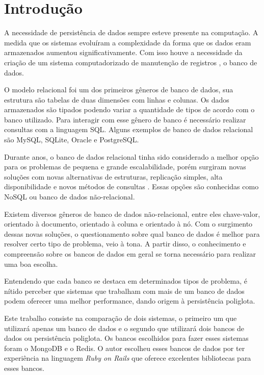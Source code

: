 \chapter{Introdução}\label{chap:introducao}
A necessidade de persistência de dados sempre esteve presente na computação. A medida que os sistemas evoluíram a complexidade da forma que os dados eram armazenados aumentou significativamente. Com isso houve a necessidade da criação de um sistema computadorizado de manutenção de registros \cite{CJDate}, o banco de dados.

O modelo relacional foi um dos primeiros gêneros de banco de dados, sua estrutura são tabelas de duas dimensões com linhas e colunas. Os dados armazenados são tipados podendo variar a quantidade de tipos de acordo com o banco utilizado. Para interagir com esse gênero de banco é necessário realizar consultas com a linguagem SQL. Alguns exemplos de banco de dados relacional são MySQL, SQLite, Oracle e PostgreSQL.

Durante anos, o banco de dados relacional tinha sido considerado a melhor opção para os problemas de pequena e grande escalabilidade, porém surgiram novas soluções com novas alternativas de estruturas, replicação simples, alta disponibilidade e novos métodos de consultas \cite{SDSW}. Essas opções são conhecidas como NoSQL ou banco de dados não-relacional.

Existem diversos gêneros de banco de dados não-relacional, entre eles chave-valor, orientado à documento, orientado à coluna e orientado à nó. Com o surgimento dessas novas soluções, o questionamento sobre qual banco de dados é melhor para resolver certo tipo de problema, veio à tona. A partir disso, o conhecimento e compreensão sobre os bancos de dados em geral se torna necessário para realizar uma boa escolha.

Entendendo que cada banco se destaca em determinados tipos de problema, é nítido perceber que sistemas que trabalham com mais de um banco de dados podem oferecer uma melhor performance, dando origem à persistência poliglota.

Este trabalho consiste na comparação de dois sistemas, o primeiro um que utilizará apenas um banco de dados e o segundo que utilizará dois bancos de dados ou persistência poliglota. Os bancos escolhidos para fazer esses sistemas foram o MongoDB e o Redis. O autor escolheu esses bancos de dados por ter experiência na linguagem \textit{Ruby on Rails} que oferece excelentes bibliotecas para esses bancos.

